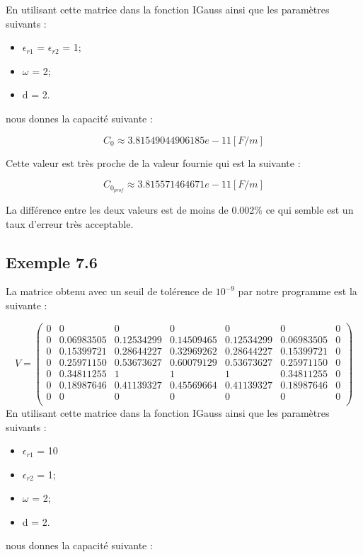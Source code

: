 En utilisant cette matrice dans la fonction IGauss ainsi que les paramètres suivants : 

\begin{itemize}
\item $\epsilon_{r1}$ = $\epsilon_{r2}$ = 1;
\item $\omega$ = 2;
\item d = 2.
\end{itemize}
nous donnes la capacité suivante :

\begin{equation}
	C_0 \approx 3.81549044906185e-11 [F/m]
\end{equation}

Cette valeur est très proche de la valeur fournie qui est la suivante :

\begin{equation}
	C_{0_{prof}} \approx 3.815571464671e-11 [F/m]
\end{equation}

La différence entre les deux valeurs est de moins de 0.002\% ce qui semble est un taux d'erreur très acceptable.
\subsection{Exemple 7.6}
La matrice obtenu avec un seuil de tolérence de $10^{-9}$ par notre programme est la suivante : 

\[V  = \left(\begin{array}{ccccccc}
0 & 0 			& 0 			& 0 			& 0 			& 0 			& 0 \\
0 & 0.06983505 	& 0.12534299 	& 0.14509465	& 0.12534299	& 0.06983505 	& 0 \\
0 & 0.15399721 	& 0.28644227 	& 0.32969262 	& 0.28644227 	& 0.15399721 	& 0 \\
0 & 0.25971150 	& 0.53673627 	& 0.60079129  	& 0.53673627 	& 0.25971150 	& 0 \\
0 & 0.34811255 	& 1				& 1				& 1			 	& 0.34811255 	& 0 \\
0 & 0.18987646 	& 0.41139327 	& 0.45569664	& 0.41139327 	& 0.18987646 	& 0 \\
0 & 0 			& 0 			& 0 			& 0 			& 0 			& 0 \\
\end{array} \right)\]
\newline
\newline
En utilisant cette matrice dans la fonction IGauss ainsi que les paramètres suivants : 

\begin{itemize}
\item $\epsilon_{r1}$ = 10
\item $\epsilon_{r2}$ = 1;
\item $\omega$ = 2;
\item d = 2.
\end{itemize}
nous donnes la capacité suivante :

